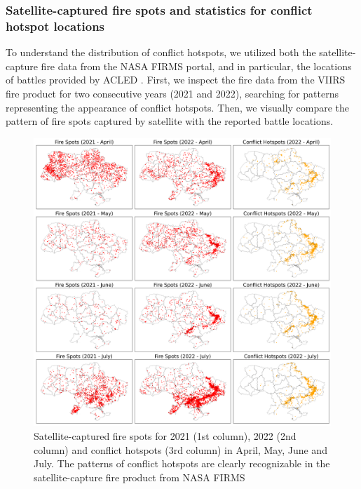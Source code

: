 \subsubsection*{Satellite-captured fire spots and statistics for conflict hotspot locations}
To understand the distribution of conflict hotspots, we utilized both the satellite-capture fire data from the NASA FIRMS portal, and in particular, the locations of battles provided by ACLED \citep{raleigh2010introducing}. First, we inspect the fire data from the VIIRS fire product for two consecutive years (2021 and 2022), searching for patterns representing the appearance of conflict hotspots. Then, we visually compare the pattern of fire spots captured by satellite with the reported battle locations.\par

\begin{figure}[p]
    \centering
    \includegraphics[width=\textwidth]{figs/chap3/fig6.png}
    \caption[Analyzed conflict hotspots using satellite and ACLED data]{Satellite-captured fire spots for 2021 (1st column), 2022 (2nd column) and conflict hotspots (3rd column) in April, May, June and July. The patterns of conflict hotspots are clearly recognizable in the satellite-capture fire product from NASA FIRMS}
    \label{fig:chap3_fig6}
\end{figure}

